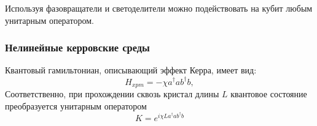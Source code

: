 Используя фазовращатели и светоделители можно подействовать на кубит любым
унитарным оператором.

\subsubsection{Нелинейные керровские среды}

Квантовый гамильтониан, описывающий эффект Керра, имеет вид:
\begin{equation}
  H_{xpm} = -\chi a^\dag a b^\dag b,
\end{equation}
Соответственно, при прохождении сквозь кристал длины $L$ квантовое состояние
преобразуется унитарным оператором
\begin{equation}
  K = e^{i\chi La^\dag a b^\dag b}
\end{equation}

